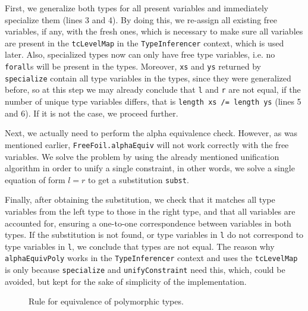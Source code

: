 First, we generalize both types for all present variables and immediately specialize them (lines 3 and 4). By doing this, we re-assign all existing free variables, if any, with the fresh ones, which is necessary to make sure all variables are present in the \texttt{tcLevelMap} in the \texttt{TypeInferencer} context, which is used later. Also, specialized types now can only have free type variables, i.e. no \texttt{forall}s will be present in the types. Moreover, \texttt{xs} and \texttt{ys} returned by \texttt{specialize} contain all type variables in the types, since they were generalized before, so at this step we may already conclude that \texttt{l} and \texttt{r} are not equal, if the number of unique type variables differs, that is \texttt{length xs /= length ys} (lines 5 and 6). If it is not the case, we proceed further.

Next, we actually need to perform the alpha equivalence check. However, as was mentioned earlier, \texttt{FreeFoil.alphaEquiv} will not work correctly with the free variables. We solve the problem by using the already mentioned unification algorithm in order to unify a single constraint, in other words, we solve a single equation of form $l = r$ to get a substitution \texttt{subst}.

Finally, after obtaining the substitution, we check that it matches all type variables from the left type to those in the right type, and that all variables are accounted for, ensuring a one-to-one correspondence between variables in both types. If the substitution is not found, or type variables in \texttt{l} do not correspond to type variables in \texttt{l}, we conclude that types are not equal. The reason why \texttt{alphaEquivPoly} works in the \texttt{TypeInferencer} context and uses the \texttt{tcLevelMap} is only because \texttt{specialize} and \texttt{unifyConstraint} need this, which, could be avoided, but kept for the sake of simplicity of the implementation.

\begin{figure}[H]
  \begin{prooftree*}
  \end{prooftree*}
  \caption{Rule for equivalence of polymorphic types.}
  \label{fig:alpha-equiv-poly-rule}
\end{figure}


